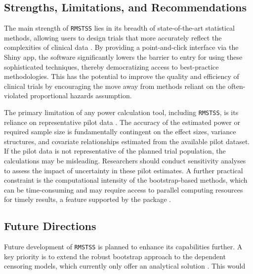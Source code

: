 \documentclass[article]{jss}
\begin{document}
\subsection{Strengths, Limitations, and Recommendations}
The main strength of \texttt{RMSTSS} lies in its breadth of state-of-the-art statistical methods, allowing users to design trials that more accurately reflect the complexities of clinical data \cite{[1]}. By providing a point-and-click interface via the Shiny app, the software significantly lowers the barrier to entry for using these sophisticated techniques, thereby democratizing access to best-practice methodologies. This has the potential to improve the quality and efficiency of clinical trials by encouraging the move away from methods reliant on the often-violated proportional hazards assumption.

The primary limitation of any power calculation tool, including \texttt{RMSTSS}, is its reliance on representative pilot data \cite{[1]}. The accuracy of the estimated power or required sample size is fundamentally contingent on the effect sizes, variance structures, and covariate relationships estimated from the available pilot dataset. If the pilot data is not representative of the planned trial population, the calculations may be misleading. Researchers should conduct sensitivity analyses to assess the impact of uncertainty in these pilot estimates. A further practical constraint is the computational intensity of the bootstrap-based methods, which can be time-consuming and may require access to parallel computing resources for timely results, a feature supported by the package \cite{[1]}.

\subsection{Future Directions}
Future development of \texttt{RMSTSS} is planned to enhance its capabilities further. A key priority is to extend the robust bootstrap approach to the dependent censoring models, which currently only offer an analytical solution \cite{[1]}. This would
\end{document}
